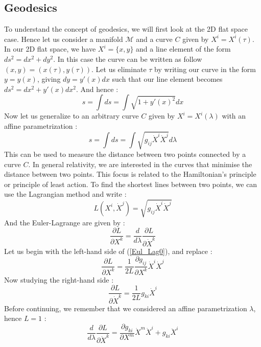 \documentclass[a4paper,12pt]{article}
\theoremstyle{definition}
\begin{document}
\subsection{Geodesics}
To understand the concept of geodesics, we will first look at the 2D flat space case.
Hence let us consider a manifold $\mathcal{M}$ and a curve $C$ given by $X^i=X^i(\tau)$.
In our 2D flat space, we have $X^i=\{x,y\}$ and a line element of the form $ds^2=dx^2+dy^2$.
In this case the curve can be written as follow $(x,y)=(x(\tau),y(\tau))$.
Let us eliminate $\tau$ by writing our curve in the form $y=y(x)$, giving $dy=y'(x)dx$ such that our line element becomes $ds^2=dx^2+y'(x)dx^2$.
And hence :
\begin{equation}
	s=\int ds=\int \sqrt{1+y'(x)^2}dx
\end{equation}
Now let us generalize to an arbitrary curve $C$ given by $X^i=X^i(\lambda)$ with an affine parametrization :
\begin{equation}
	s=\int ds=\int \sqrt{g_{ij}\dot{X}^i\dot{X}^j}d\lambda
\end{equation}
This can be used to measure the distance between two points connected by a curve $C$.
In general relativity, we are interested in the curves that minimise the distance between two points.
This focus is related to the Hamiltonian's principle or principle of least action.
To find the shortest lines between two points, we can use the Lagrangian method and write :
\begin{equation}
	L(X^i,\dot{X}^j)=\sqrt{g_{ij}\dot{X}^i\dot{X}^j}
\end{equation}
And the Euler-Lagrange are given by :
\begin{equation}\label{Eul_Lag0}
	\frac{\partial L}{\partial X^k}=\frac{d}{d\lambda}\frac{\partial L}{\partial \dot{X}^k}
\end{equation}
Let us begin with the left-hand side of (\ref{Eul_Lag0}), and replace :
\begin{equation}
	\frac{\partial L}{\partial X^k}=\frac{1}{2L}\frac{\partial g_{ij}}{\partial X^k}\dot{X}^i\dot{X}^j
\end{equation}
Now studying the right-hand side :
\begin{equation}
	\frac{\partial L}{\partial \dot{X}^k}=\frac{1}{2L}g_{ki}\dot{X}^i
\end{equation}
Before continuing, we remember that we considered an affine parametrization $\lambda$, hence $L=1$ :
\begin{equation}
	\frac{d}{d\lambda}\frac{\partial L}{\partial \dot{X}^k}=
	\frac{\partial g_{ki}}{\partial X^m}\dot{X}^m\dot{X}^i+g_{ki}\ddot{X}^i
\end{equation}
\end{document}
